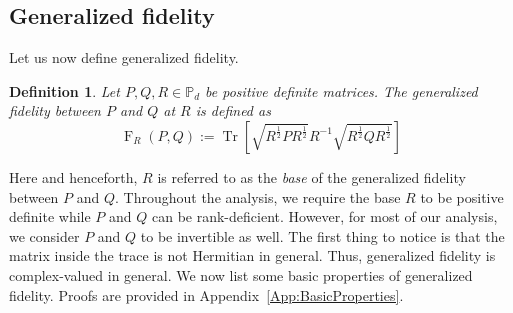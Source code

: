 \documentclass[12pt]{article}
\newtheorem{definition}[theorem]{Definition}
\theoremstyle{definition}
\begin{document}
\subsection{Generalized fidelity}

Let us now define generalized fidelity. 
\begin{definitionbox}
    \begin{definition}     Let $P,Q,R \in \mathbb{P}_d$ be positive definite matrices. The \emph{generalized fidelity between}  $P$ \textit{and} $Q$ \textit{at} $R$  is defined as
    \begin{equation}
         \operatorname{F}_R(P, Q) :=  \operatorname{Tr}  \left[\sqrt{R ^{\frac12} P R ^{\frac12} } R ^{-1} \sqrt{R ^\frac12 Q R ^\frac12}\right] 
    \end{equation} 
\end{definition}
\end{definitionbox}
Here and henceforth, $R$ is referred to as the \textit{base} of the generalized fidelity between $P$ and $Q$. Throughout the analysis, we require the base $R$ to be positive definite while $P$ and $Q$ can be rank-deficient. However, for most of our analysis, we consider $P$ and $Q$ to be invertible as well. The first thing to notice is that the matrix inside the trace is not Hermitian in general. Thus, generalized fidelity is complex-valued in general. We now list some basic properties of generalized fidelity. Proofs are provided in Appendix~\ref{App:BasicProperties}.
\end{document}
